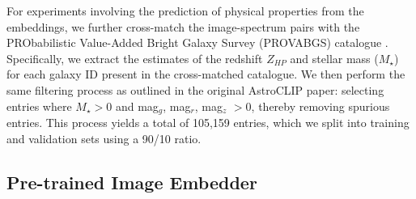 \documentclass[draft, a4paper,12pt]{article}
\begin{document}
For experiments involving the prediction of physical properties from the embeddings, we further cross-match the image-spectrum pairs with the PRObabilistic Value-Added Bright Galaxy Survey (PROVABGS) catalogue \cite{PROVABGS}. Specifically, we extract the estimates of the redshift $Z_{HP}$ and stellar mass ($M_{\star}$) for each galaxy ID present in the cross-matched catalogue. We then perform the same filtering process as outlined in the original AstroCLIP paper: selecting entries where $M_{\star} > 0$ and mag$_g$, mag$_r$, mag$_z$ $> 0$, thereby removing spurious entries. This process yields a total of 105,159 entries, which we split into training and validation sets using a 90/10 ratio.


\subsection{Pre-trained Image Embedder} 
\label{sec:resnet}
\end{document}
